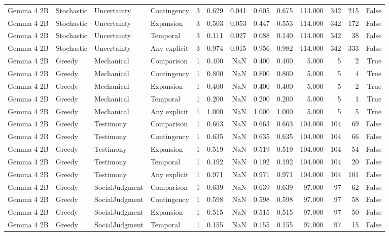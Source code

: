 \begin{tabular}{llllrrrrrrrrr}
Gemma 4 2B & Stochastic & Uncertainty & Contingency & 3 & 0.629 & 0.041 & 0.605 & 0.675 & 114.000 & 342 & 215 & False \\
Gemma 4 2B & Stochastic & Uncertainty & Expansion & 3 & 0.503 & 0.053 & 0.447 & 0.553 & 114.000 & 342 & 172 & False \\
Gemma 4 2B & Stochastic & Uncertainty & Temporal & 3 & 0.111 & 0.027 & 0.088 & 0.140 & 114.000 & 342 & 38 & False \\
Gemma 4 2B & Stochastic & Uncertainty & Any explicit & 3 & 0.974 & 0.015 & 0.956 & 0.982 & 114.000 & 342 & 333 & False \\
Gemma 4 2B & Greedy & Mechanical & Comparison & 1 & 0.400 & NaN & 0.400 & 0.400 & 5.000 & 5 & 2 & True \\
Gemma 4 2B & Greedy & Mechanical & Contingency & 1 & 0.800 & NaN & 0.800 & 0.800 & 5.000 & 5 & 4 & True \\
Gemma 4 2B & Greedy & Mechanical & Expansion & 1 & 0.400 & NaN & 0.400 & 0.400 & 5.000 & 5 & 2 & True \\
Gemma 4 2B & Greedy & Mechanical & Temporal & 1 & 0.200 & NaN & 0.200 & 0.200 & 5.000 & 5 & 1 & True \\
Gemma 4 2B & Greedy & Mechanical & Any explicit & 1 & 1.000 & NaN & 1.000 & 1.000 & 5.000 & 5 & 5 & True \\
Gemma 4 2B & Greedy & Testimony & Comparison & 1 & 0.663 & NaN & 0.663 & 0.663 & 104.000 & 104 & 69 & False \\
Gemma 4 2B & Greedy & Testimony & Contingency & 1 & 0.635 & NaN & 0.635 & 0.635 & 104.000 & 104 & 66 & False \\
Gemma 4 2B & Greedy & Testimony & Expansion & 1 & 0.519 & NaN & 0.519 & 0.519 & 104.000 & 104 & 54 & False \\
Gemma 4 2B & Greedy & Testimony & Temporal & 1 & 0.192 & NaN & 0.192 & 0.192 & 104.000 & 104 & 20 & False \\
Gemma 4 2B & Greedy & Testimony & Any explicit & 1 & 0.971 & NaN & 0.971 & 0.971 & 104.000 & 104 & 101 & False \\
Gemma 4 2B & Greedy & SocialJudgment & Comparison & 1 & 0.639 & NaN & 0.639 & 0.639 & 97.000 & 97 & 62 & False \\
Gemma 4 2B & Greedy & SocialJudgment & Contingency & 1 & 0.598 & NaN & 0.598 & 0.598 & 97.000 & 97 & 58 & False \\
Gemma 4 2B & Greedy & SocialJudgment & Expansion & 1 & 0.515 & NaN & 0.515 & 0.515 & 97.000 & 97 & 50 & False \\
Gemma 4 2B & Greedy & SocialJudgment & Temporal & 1 & 0.155 & NaN & 0.155 & 0.155 & 97.000 & 97 & 15 & False \\

\end{tabular}
